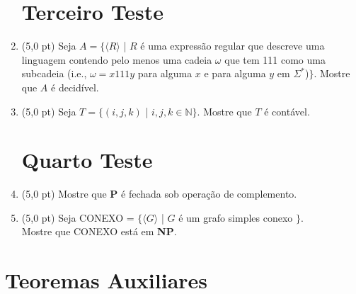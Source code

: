 \documentclass[12pt,a4paper,oneside]{article}
\begin{document}
\begin{enumerate}
	
	\section*{Terceiro Teste}
	
	\item (5,0 pt)  Seja $A = \{\langle R \rangle$ | $R$ é uma expressão regular que descreve uma linguagem contendo pelo menos uma cadeia $\omega$ que tem 111 como uma subcadeia (i.e., $\omega = x111y$ para alguma $x$ e para alguma $y$ em $\Sigma^*$)$\}$. Mostre que $A$ é decidível.
	
	\item (5,0 pt) Seja $T = \{(i,j,k)$ | $i,j,k \in \mathbb{N}\}$. Mostre que $T$ é contável.
	
	\section*{Quarto Teste}
	
	\item (5,0 pt) Mostre que {\bf P} é fechada sob operação de complemento.
	
	\item (5,0 pt) Seja CONEXO = $\{ \langle G \rangle$ | $G$ é um grafo simples conexo $\}$. \\Mostre que CONEXO está em {\bf NP}.

\end{enumerate}

\section*{Teoremas Auxiliares}
\end{document}
